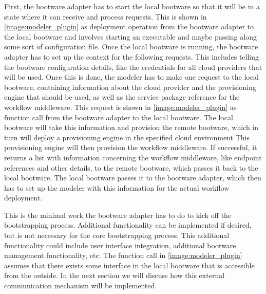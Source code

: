 First, the bootware adapter has to start the local bootware so that it will be in a state where it can receive and process requests.
This is shown in \autoref{image:modeler_plugin} as deployment operation from the bootware adapter to the local bootware and involves starting an executable and maybe passing along some sort of configuration file.
Once the local bootware is running, the bootware adapter has to set up the context for the following requests.
This includes telling the bootware configuration details, like the credentials for all cloud providers that will be used.
Once this is done, the modeler has to make one request to the local bootware, containing information about the cloud provider and the provisioning engine that should be used, as well as the service package reference for the workflow middleware.
This request is shown in \autoref{image:modeler_plugin} as function call from the bootware adapter to the local bootware.
The local bootware will take this information and provision the remote bootware, which in turn will deploy a provisioning engine in the specified cloud environment
This provisioning engine will then provision the workflow middleware.
If successful, it returns a list with information concerning the workflow middleware, like endpoint references and other details, to the remote bootware, which passes it back to the local bootware.
The local bootware passes it to the bootware adapter, which then has to set up the modeler with this information for the actual workflow deployment.

This is the minimal work the bootware adapter has to do to kick off the bootstrapping process.
Additional functionality can be implemented if desired, but is not necessary for the core bootstrapping process.
This additional functionality could include user interface integration, additional bootware management functionality, etc.
The function call in \autoref{image:modeler_plugin} assumes that there exists some interface in the local bootware that is accessible from the outside.
In the next section we will discuss how this external communication mechanism will be implemented.
